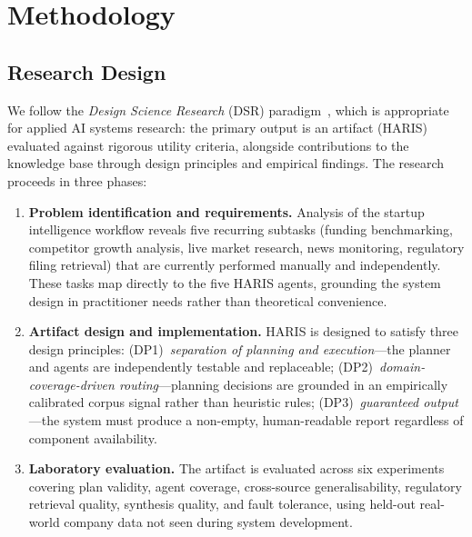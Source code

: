 \documentclass[preprint,12pt]{elsarticle}
\begin{document}
\section{Methodology}
\label{sec:method}

\subsection{Research Design}

We follow the \emph{Design Science Research} (DSR) paradigm~\cite{hevner2004design},
which is appropriate for applied AI systems research: the primary output is an
artifact (HARIS) evaluated against rigorous utility criteria, alongside
contributions to the knowledge base through design principles and empirical
findings. The research proceeds in three phases:

\begin{enumerate}[label=(\arabic*)]
  \item \textbf{Problem identification and requirements.} Analysis of the
        startup intelligence workflow reveals five recurring subtasks (funding
        benchmarking, competitor growth analysis, live market research, news
        monitoring, regulatory filing retrieval) that are currently performed
        manually and independently. These tasks map directly to the five HARIS
        agents, grounding the system design in practitioner needs rather than
        theoretical convenience.

  \item \textbf{Artifact design and implementation.} HARIS is designed to
        satisfy three design principles: (DP1)~\emph{separation of planning and
        execution}---the planner and agents are independently testable and
        replaceable; (DP2)~\emph{domain-coverage-driven routing}---planning
        decisions are grounded in an empirically calibrated corpus signal rather
        than heuristic rules; (DP3)~\emph{guaranteed output}---the system must
        produce a non-empty, human-readable report regardless of component
        availability.

  \item \textbf{Laboratory evaluation.} The artifact is evaluated across six
        experiments covering plan validity, agent coverage, cross-source
        generalisability, regulatory retrieval quality, synthesis quality, and
        fault tolerance, using held-out real-world company data not seen during
        system development.
\end{enumerate}
\end{document}

